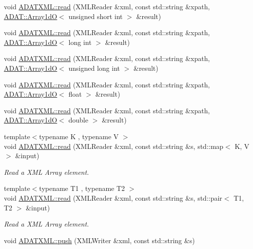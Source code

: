 \begin{DoxyCompactItemize}
\item 
void \mbox{\hyperlink{group__io_gafcc468224ec7aadb6f062319ee4a9017}{A\+D\+A\+T\+X\+M\+L\+::read}} (X\+M\+L\+Reader \&xml, const std\+::string \&xpath, \mbox{\hyperlink{classADAT_1_1Array1dO}{A\+D\+A\+T\+::\+Array1dO}}$<$ unsigned short int $>$ \&result)
\item 
void \mbox{\hyperlink{group__io_gaf73cf1373de71e822e6e7ddb48581714}{A\+D\+A\+T\+X\+M\+L\+::read}} (X\+M\+L\+Reader \&xml, const std\+::string \&xpath, \mbox{\hyperlink{classADAT_1_1Array1dO}{A\+D\+A\+T\+::\+Array1dO}}$<$ long int $>$ \&result)
\item 
void \mbox{\hyperlink{group__io_gabf73a226451fbe3963eed7cf3fbc6849}{A\+D\+A\+T\+X\+M\+L\+::read}} (X\+M\+L\+Reader \&xml, const std\+::string \&xpath, \mbox{\hyperlink{classADAT_1_1Array1dO}{A\+D\+A\+T\+::\+Array1dO}}$<$ unsigned long int $>$ \&result)
\item 
void \mbox{\hyperlink{group__io_ga2fb042288bd86fb85377268d95b5e39f}{A\+D\+A\+T\+X\+M\+L\+::read}} (X\+M\+L\+Reader \&xml, const std\+::string \&xpath, \mbox{\hyperlink{classADAT_1_1Array1dO}{A\+D\+A\+T\+::\+Array1dO}}$<$ float $>$ \&result)
\item 
void \mbox{\hyperlink{group__io_ga6356b58aa7c58aa4bb8eaed5db9f8f40}{A\+D\+A\+T\+X\+M\+L\+::read}} (X\+M\+L\+Reader \&xml, const std\+::string \&xpath, \mbox{\hyperlink{classADAT_1_1Array1dO}{A\+D\+A\+T\+::\+Array1dO}}$<$ double $>$ \&result)
\item 
{\footnotesize template$<$typename K , typename V $>$ }\\void \mbox{\hyperlink{group__io_ga01c7047fcb175e3518660cdab70536c9}{A\+D\+A\+T\+X\+M\+L\+::read}} (X\+M\+L\+Reader \&xml, const std\+::string \&s, std\+::map$<$ K, V $>$ \&input)
\begin{DoxyCompactList}\small\item\em Read a X\+ML Array element. \end{DoxyCompactList}\item 
{\footnotesize template$<$typename T1 , typename T2 $>$ }\\void \mbox{\hyperlink{group__io_gaa94af0693db4178d032a64ee2d3c5439}{A\+D\+A\+T\+X\+M\+L\+::read}} (X\+M\+L\+Reader \&xml, const std\+::string \&s, std\+::pair$<$ T1, T2 $>$ \&input)
\begin{DoxyCompactList}\small\item\em Read a X\+ML Array element. \end{DoxyCompactList}\item 
void \mbox{\hyperlink{group__io_ga019b535f09d2107aa9012cd3fce58193}{A\+D\+A\+T\+X\+M\+L\+::push}} (X\+M\+L\+Writer \&xml, const std\+::string \&s)

\end{DoxyCompactItemize}
